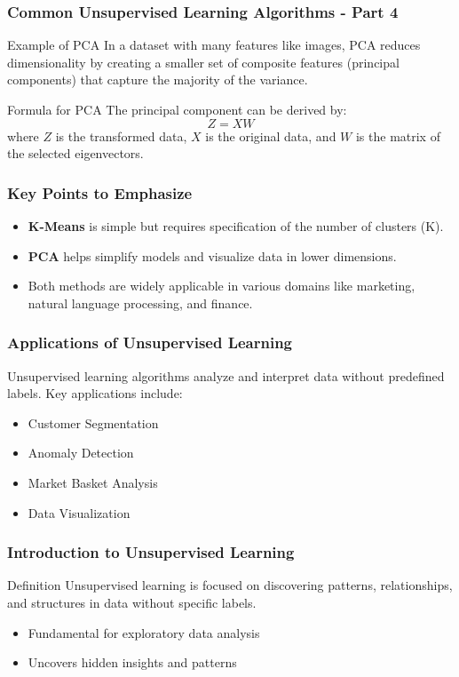 \documentclass{beamer}
\begin{document}
\begin{frame}[fragile]
    \frametitle{Common Unsupervised Learning Algorithms - Part 4}
    \begin{block}{Example of PCA}
        In a dataset with many features like images, PCA reduces dimensionality by creating a smaller set of composite features (principal components) that capture the majority of the variance.
    \end{block}
    
    \begin{block}{Formula for PCA}
        The principal component can be derived by:
        \begin{equation}
            Z = XW
        \end{equation}
        where \( Z \) is the transformed data, \( X \) is the original data, and \( W \) is the matrix of the selected eigenvectors.
    \end{block}
\end{frame}

\begin{frame}[fragile]
    \frametitle{Key Points to Emphasize}
    \begin{itemize}
        \item \textbf{K-Means} is simple but requires specification of the number of clusters (K).
        \item \textbf{PCA} helps simplify models and visualize data in lower dimensions.
        \item Both methods are widely applicable in various domains like marketing, natural language processing, and finance.
    \end{itemize}
\end{frame}

\begin{frame}
    \frametitle{Applications of Unsupervised Learning}
    Unsupervised learning algorithms analyze and interpret data without predefined labels. Key applications include:
    \begin{itemize}
        \item Customer Segmentation
        \item Anomaly Detection
        \item Market Basket Analysis
        \item Data Visualization
    \end{itemize}
\end{frame}

\begin{frame}
    \frametitle{Introduction to Unsupervised Learning}
    \begin{block}{Definition}
        Unsupervised learning is focused on discovering patterns, relationships, and structures in data without specific labels.
    \end{block}
    \begin{itemize}
        \item Fundamental for exploratory data analysis
        \item Uncovers hidden insights and patterns
    \end{itemize}
\end{frame}
\end{document}
